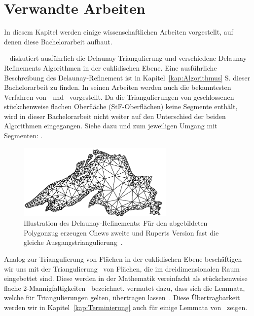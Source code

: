 \chapter{ Verwandte Arbeiten}


In diesem Kapitel werden einige wissenschaftlichen Arbeiten vorgestellt,
auf denen diese Bachelorarbeit aufbaut.

\citeauthor{SHEWCHUK:2002:chuws}~\cite{shewchuk:1997:delaunay,SHEWCHUK:2002:chuws} diskutiert ausführlich die Delaunay-Triangulierung und verschiedene Delaunay-Refinements Algorithmen in der euklidischen Ebene. Eine ausführliche Beschreibung des Delaunay-Refinement ist in Kapitel~\ref{kap:Algorithmus} S.\pageref{kap:Algorithmus} dieser Bachelorarbeit zu finden.
In seinen Arbeiten werden auch die bekanntesten Verfahren von~\citet{chew:1993:guaranteed,chew:1989:guaranteed} und~\citet{ruppert:1995:delaunay} vorgestellt.
Da die Triangulierungen von geschlossenen stückchenweise flachen Oberfläche (StF-Oberflächen) keine Segmente enthält, wird in dieser Bachelorarbeit nicht weiter auf den Unterschied der beiden Algorithmen eingegangen. Siehe dazu und zum jeweiligen Umgang mit Segmenten: \citeauthor{shewchuk:1997:delaunay}.\\
\begin{figure}[ht]%
    \centering
  \includegraphics[width=3in]{images/tripslg.png}
  \caption{Illustration des Delaunay-Refinements:
  Für den abgebildeten Polygonzug erzeugen Chews zweite und Ruperts Version fast die gleiche Ausgangstriangulierung~\cite{SHEWCHUK:2002:chuws}.}
\end{figure} 

Analog zur Triangulierung von Flächen in der euklidischen Ebene beschäftigen wir uns mit der Triangulierung~\cite{Bobenko:2007:LaplaceBeltrami} von Flächen, die im dreidimensionalen Raum eingebettet sind. Diese werden in der Mathematik  vereinfacht als stückchenweise flache 2-Mannigfaltigkeiten~\cite{betke:1984:2-Mannigfaltigkeiten} bezeichnet.
\citeauthor{SHEWCHUK:2002:chuws} vermutet dazu, dass sich die Lemmata, welche für Triangulierungen gelten, übertragen lassen~\cite[Abschnitte 5.3.2]{SHEWCHUK:2002:chuws}. Diese Übertragbarkeit werden wir in Kapitel~\ref{kap:Terminierung}  auch für einige Lemmata von~\citet{ruppert:1995:delaunay} zeigen.\\  

